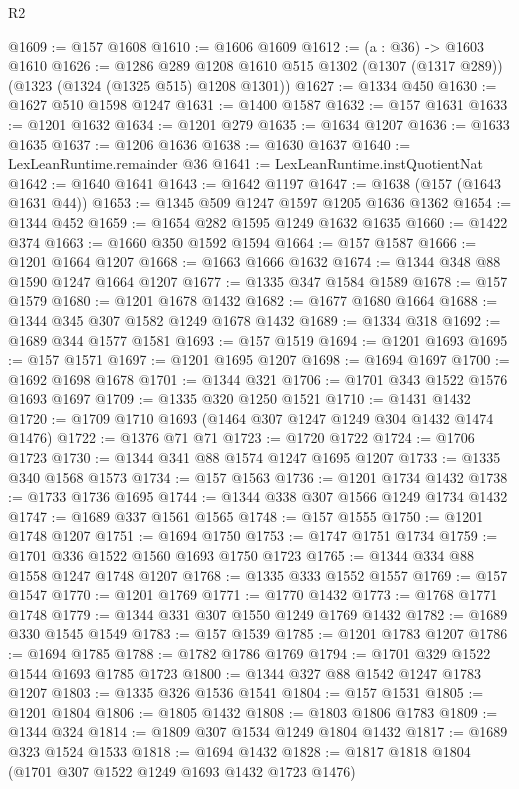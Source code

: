 \begin{lexlean}{R2}
\begin{coremodule}
@1609 := @157 @1608
@1610 := @1606 @1609
@1612 := (a : @36) -> @1603 @1610
@1626 := @1286
    @289
    @1208
    @1610
    @515
    @1302
    (@1307 (@1317 @289))
    (@1323 (@1324 (@1325 @515) @1208 @1301))
@1627 := @1334 @450
@1630 := @1627 @510 @1598 @1247
@1631 := @1400 @1587
@1632 := @157 @1631
@1633 := @1201 @1632
@1634 := @1201 @279
@1635 := @1634 @1207
@1636 := @1633 @1635
@1637 := @1206 @1636
@1638 := @1630 @1637
@1640 := LexLeanRuntime.remainder @36
@1641 := LexLeanRuntime.instQuotientNat
@1642 := @1640 @1641
@1643 := @1642 @1197
@1647 := @1638 (@157 (@1643 @1631 @44))
@1653 := @1345 @509 @1247 @1597 @1205 @1636 @1362
@1654 := @1344 @452
@1659 := @1654 @282 @1595 @1249 @1632 @1635
@1660 := @1422 @374
@1663 := @1660 @350 @1592 @1594
@1664 := @157 @1587
@1666 := @1201 @1664 @1207
@1668 := @1663 @1666 @1632
@1674 := @1344 @348 @88 @1590 @1247 @1664 @1207
@1677 := @1335 @347 @1584 @1589
@1678 := @157 @1579
@1680 := @1201 @1678 @1432
@1682 := @1677 @1680 @1664
@1688 := @1344 @345 @307 @1582 @1249 @1678 @1432
@1689 := @1334 @318
@1692 := @1689 @344 @1577 @1581
@1693 := @157 @1519
@1694 := @1201 @1693
@1695 := @157 @1571
@1697 := @1201 @1695 @1207
@1698 := @1694 @1697
@1700 := @1692 @1698 @1678
@1701 := @1344 @321
@1706 := @1701 @343 @1522 @1576 @1693 @1697
@1709 := @1335 @320 @1250 @1521
@1710 := @1431 @1432
@1720 := @1709 @1710 @1693 (@1464 @307 @1247 @1249 @304 @1432 @1474 @1476)
@1722 := @1376 @71 @71
@1723 := @1720 @1722
@1724 := @1706 @1723
@1730 := @1344 @341 @88 @1574 @1247 @1695 @1207
@1733 := @1335 @340 @1568 @1573
@1734 := @157 @1563
@1736 := @1201 @1734 @1432
@1738 := @1733 @1736 @1695
@1744 := @1344 @338 @307 @1566 @1249 @1734 @1432
@1747 := @1689 @337 @1561 @1565
@1748 := @157 @1555
@1750 := @1201 @1748 @1207
@1751 := @1694 @1750
@1753 := @1747 @1751 @1734
@1759 := @1701 @336 @1522 @1560 @1693 @1750 @1723
@1765 := @1344 @334 @88 @1558 @1247 @1748 @1207
@1768 := @1335 @333 @1552 @1557
@1769 := @157 @1547
@1770 := @1201 @1769
@1771 := @1770 @1432
@1773 := @1768 @1771 @1748
@1779 := @1344 @331 @307 @1550 @1249 @1769 @1432
@1782 := @1689 @330 @1545 @1549
@1783 := @157 @1539
@1785 := @1201 @1783 @1207
@1786 := @1694 @1785
@1788 := @1782 @1786 @1769
@1794 := @1701 @329 @1522 @1544 @1693 @1785 @1723
@1800 := @1344 @327 @88 @1542 @1247 @1783 @1207
@1803 := @1335 @326 @1536 @1541
@1804 := @157 @1531
@1805 := @1201 @1804
@1806 := @1805 @1432
@1808 := @1803 @1806 @1783
@1809 := @1344 @324
@1814 := @1809 @307 @1534 @1249 @1804 @1432
@1817 := @1689 @323 @1524 @1533
@1818 := @1694 @1432
@1828 := @1817 @1818 @1804 (@1701 @307 @1522 @1249 @1693 @1432 @1723 @1476)

\end{coremodule}
\end{lexlean}
